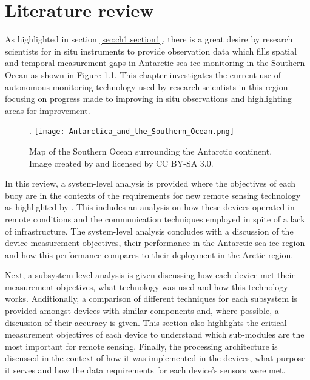 
\chapter{Literature review}
\label{ch:chapter2}
As highlighted in section \ref{sec:ch1.section1}, there is a great desire by research scientists for in situ instruments to provide observation data which fills spatial and temporal measurement gaps in Antarctic sea ice monitoring in the Southern Ocean as shown in Figure \ref{fig:Antarctica_Southern_Ocean}. This chapter investigates the current use of autonomous monitoring technology used by research scientists in this region focusing on progress made to improving in situ observations and highlighting areas for improvement. 
\begin{figure}[H]
	\centering. 
	\texttt{[image: Antarctica\_and\_the\_Southern\_Ocean.png]}
	\caption{Map of the Southern Ocean surrounding the Antarctic continent. Image created by \textcite{Hogweed2015Ocean} and licensed by CC BY-SA 3.0.}
	\label{fig:Antarctica_Southern_Ocean}
\end{figure}

 In this review, a system-level  analysis is provided where the objectives of each buoy are in the contexts of the requirements for new remote sensing technology as highlighted by \textcite{kennicutt2016delivering}. This includes an analysis on how these devices operated in remote conditions and the communication techniques employed in spite of a lack of infrastructure. The system-level analysis concludes with a discussion of the device measurement objectives, their performance in the Antarctic sea ice region and how this performance compares to their deployment in the Arctic region.\par
 
Next, a subsystem level analysis is given discussing how each device met their measurement objectives, what technology was used and how this technology works. Additionally, a comparison of different techniques for each subsystem is provided amongst devices with similar components and, where possible, a discussion of their accuracy is given. This section also highlights the critical measurement objectives of each device to understand which sub-modules are the most important for remote sensing. Finally, the processing architecture is discussed in the context of how it was implemented in the devices, what purpose it serves and how the data requirements for each device's sensors were met.

